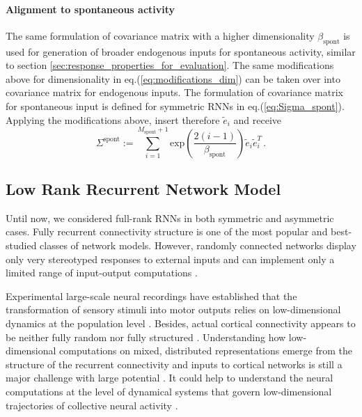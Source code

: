 \documentclass[11pt]{article}
\begin{document}
	\paragraph{Alignment to spontaneous activity} %
	The same formulation of covariance matrix with a higher dimensionality $\beta_{\text{spont}}$ is used for generation of broader endogenous inputs for spontaneous activity, similar to section \ref{sec:response_properties_for_evaluation}. The same modifications above for dimensionality in eq.(\ref{eq:modifications_dim}) can be taken over into covariance matrix for endogenous inputs. The formulation of covariance matrix for spontaneous input is defined for symmetric RNNs in eq.(\ref{eq:Sigma_spont}). Applying the modifications above, insert therefore $\tilde{e}_i$ and receive  
	  	\begin{equation} \label{eq:Sigma_spont_asym}
	  		\Sigma^{\text{spont}} := \sum_{i=1}^{M_{\text{spont}} + 1} 	\text{exp}\left(\frac{2(i-1)}{\beta_{\text{spont}}}\right) \tilde{e}_i \tilde{e}_i^T \, .
	  	\end{equation}
				  
	\clearpage
	\subsection{Low Rank Recurrent Network Model} \label{sec:low_rank_method}
	Until now, we considered full-rank RNNs in both symmetric and asymmetric cases. Fully recurrent connectivity structure is one of the most popular and best-studied classes of network models. However, randomly connected networks display only very stereotyped responses to external inputs and can implement only a limited range of input-output computations \cite{mastrogiuseppe2018linking}. 
	
	Experimental large-scale neural recordings have established that the transformation of sensory stimuli into motor outputs relies on low-dimensional dynamics at the population level \cite{mastrogiuseppe2018linking}. Besides, actual cortical connectivity appears to be neither fully random nor fully structured \cite{harris2013cortical}. Understanding how low-dimensional computations on mixed, distributed representations emerge from the structure of the recurrent connectivity and inputs to cortical networks is still a major challenge with large potential \cite{mastrogiuseppe2018linking}. It could help to understand the neural computations at the level of dynamical systems that govern low-dimensional trajectories of collective neural activity \cite{beiran2021shaping}. 
	
\end{document}

